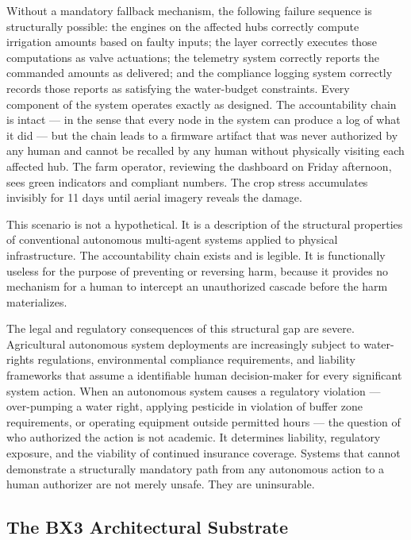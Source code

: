 Without a mandatory fallback mechanism, the following failure sequence is structurally possible: the \bounds engines on the affected hubs correctly compute irrigation amounts based on faulty inputs; the \fact layer correctly executes those computations as valve actuations; the telemetry system correctly reports the commanded amounts as delivered; and the compliance logging system correctly records those reports as satisfying the water-budget constraints. Every component of the system operates exactly as designed. The accountability chain is intact — in the sense that every node in the system can produce a log of what it did — but the chain leads to a firmware artifact that was never authorized by any human and cannot be recalled by any human without physically visiting each affected hub. The farm operator, reviewing the dashboard on Friday afternoon, sees green indicators and compliant numbers. The crop stress accumulates invisibly for 11 days until aerial imagery reveals the damage.

This scenario is not a hypothetical. It is a description of the structural properties of conventional autonomous multi-agent systems applied to physical infrastructure. The accountability chain exists and is legible. It is functionally useless for the purpose of preventing or reversing harm, because it provides no mechanism for a human to intercept an unauthorized cascade before the harm materializes.

The legal and regulatory consequences of this structural gap are severe. Agricultural autonomous system deployments are increasingly subject to water-rights regulations, environmental compliance requirements, and liability frameworks that assume a identifiable human decision-maker for every significant system action. When an autonomous system causes a regulatory violation — over-pumping a water right, applying pesticide in violation of buffer zone requirements, or operating equipment outside permitted hours — the question of who authorized the action is not academic. It determines liability, regulatory exposure, and the viability of continued insurance coverage. Systems that cannot demonstrate a structurally mandatory path from any autonomous action to a human authorizer are not merely unsafe. They are uninsurable.

\subsection{The BX3 Architectural Substrate}

